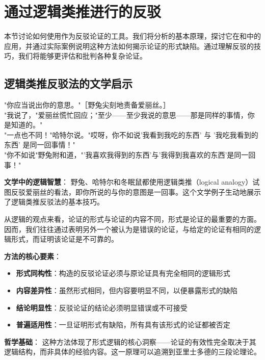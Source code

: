 \section{通过逻辑类推进行的反驳}

\begin{logicbox}[title=引言]
本节讨论如何使用作为反驳论证的工具。我们将分析的基本原理，探讨它在和中的应用，并通过实际案例说明这种方法如何揭示论证的形式缺陷。通过理解反驳的技巧，我们将能够更评估和批判各种复杂论证。
\end{logicbox}

\subsection{逻辑类推反驳法的文学启示}

\begin{examplebox}[title=《爱丽丝漫游奇境记》中的逻辑类推]
"你应当说出你的意思。"［野兔尖刻地责备爱丽丝。］\\
"我说了，"爱丽丝慌忙回应；"至少——至少我说的意思——那是同样的事情，你是知道的。"\\
"一点也不同！"哈特尔说。"哎呀，你不如说'我看到我吃的东西' 与 '我吃我看到的东西' 是同一回事情！"\\
"你不如说"野兔附和道，"'我喜欢我得到的东西'与'我得到我喜欢的东西'是同一回事！"

\textbf{文学中的逻辑智慧}：
野兔、哈特尔和冬眠鼠都使用逻辑类推（logical analogy）试图反驳爱丽丝的看法，即你所说的与你的意图是一回事。这个文学例子生动地展示了逻辑类推反驳法的基本技巧。
\end{examplebox}

\begin{theorembox}[title=逻辑类推反驳法的基本原理]
从逻辑的观点来看，论证的形式与论证的内容不同，形式是论证的最重要的方面。因而，我们往往通过表明另外一个被认为是错误的论证，与给定的论证有相同的逻辑形式，而证明该论证是不可靠的。

\textbf{方法的核心要素}：
\begin{itemize}
\item \textbf{形式同构性}：构造的反驳论证必须与原论证具有完全相同的逻辑形式
\item \textbf{内容差异性}：虽然形式相同，但内容要明显不同，以便暴露形式的缺陷
\item \textbf{结论明显性}：反驳论证的结论必须明显错误或不可接受
\item \textbf{普遍适用性}：一旦证明形式有缺陷，所有具有该形式的论证都被否定
\end{itemize}

\textbf{哲学基础}：
这种方法体现了形式逻辑的核心洞察——论证的有效性完全取决于其逻辑结构，而非具体的经验内容。这一原理可以追溯到亚里士多德的三段论理论。
\end{theorembox}

